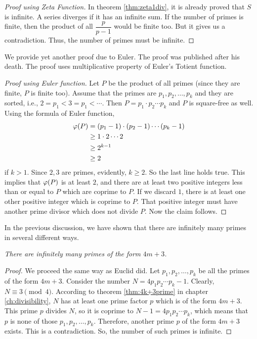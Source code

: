 \documentclass{subfiles}
\begin{document}
	\begin{proof}[Proof using Zeta Function]
		In theorem \eqref{thm:zeta1div}, it is already proved that $S$ is infinite. A series diverges if it has an infinite sum. If the number of primes is finite, then the product of all $\dfrac p{p-1}$ would be finite too. But it gives us a contradiction. Thus, the number of primes must be infinite.
	\end{proof}
	We provide yet another proof due to Euler. The proof was published after his death. The proof uses multiplicative property of Euler's Totient function.
	\begin{proof}[Proof using Euler function]
		Let $P$ be the product of all primes (since they are finite, $P$ is finite too). Assume that the primes are $p_1,p_2,\ldots, p_k$ and they are sorted, i.e., $2=p_1<3=p_1<\cdots$. Then $P = p_1\cdot p_2\cdots p_k$ and $P$ is square-free as well. Using the formula of Euler function,
		\begin{align*}
			\varphi (P)  & = (p_1-1)\cdot(p_2-1)\cdots(p_k-1)\\
			& \geq 1\cdot2\cdots2\\
			& \geq 2^{k-1}\\
			& \geq 2
		\end{align*}
		if $k>1$. Since $2,3$ are primes, evidently, $k\geq2$. So the last line holds true. This implies that $\varphi (P)$ is at least $2$, and there are at least two positive integers less than or equal to $P$ which are coprime to $P$. If we discard $1$, there is at least one other positive integer which is coprime to $P$. That positive integer must have another prime divisor which does not divide $P$. Now the claim follows.
	\end{proof}
	In the previous discussion, we have shown that there are infinitely many primes in several different ways.
	\begin{theorem}\slshape
		There are infinitely many primes of the form $4m+3$.
	\end{theorem}
	
	\begin{proof}
		We proceed the same way as Euclid did. Let $p_1,p_2,\ldots,p_k$ be all the primes of the form $4m+3$. Consider the number $N=4p_1p_2\cdots p_k-1$. Clearly, $N\equiv3\pmod4$. According to theorem \eqref{thm:4k+3prime} in chapter \eqref{ch:divisibility}, $N$ has at least one prime factor $p$ which is of the form $4m+3$. This prime $p$ divides $N$, so it is coprime to $N-1=4p_1p_2\cdots p_k$, which means that $p$ is none of those $p_1,p_2,\ldots,p_k$. Therefore, another prime $p$ of the form $4m+3$ exists. This is a contradiction. So, the number of such primes is infinite.
	\end{proof}
	
\end{document}
